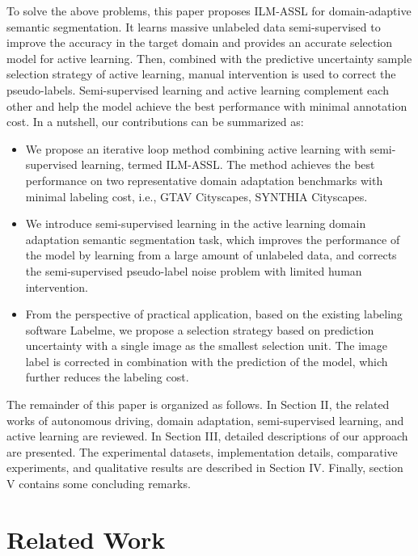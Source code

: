 \documentclass[journal]{IEEEtran}
\newcommand{\method}{ILM-ASSL\xspace}
\newcommand{\Ssl}{Semi-supervised learning\xspace}
\begin{document}
To solve the above problems, this paper proposes \method for domain-adaptive semantic segmentation. It learns massive unlabeled data semi-supervised to improve the accuracy in the target domain and provides an accurate selection model for active learning. Then, combined with the predictive uncertainty sample selection strategy of active learning, manual intervention is used to correct the pseudo-labels. \Ssl and active learning complement each other and help the model achieve the best performance with minimal annotation cost. In a nutshell, our contributions can be summarized as: 
\begin{itemize}
  \item We propose an iterative loop method combining active learning with semi-supervised learning, termed \method. The method achieves the best performance on two representative domain adaptation benchmarks with minimal labeling cost, i.e., GTAV  Cityscapes, SYNTHIA  Cityscapes.
  \item We introduce semi-supervised learning in the active learning domain adaptation semantic segmentation task, which improves the performance of the model by learning from a large amount of unlabeled data, and corrects the semi-supervised pseudo-label noise problem with limited human intervention.
  \item From the perspective of practical application, based on the existing labeling software Labelme, we propose a selection strategy based on prediction uncertainty with a single image as the smallest selection unit. The image label is corrected in combination with the prediction of the model, which further reduces the labeling cost.
\end{itemize}

The remainder of this paper is organized as follows. In Section II, the related works of autonomous driving, domain adaptation, semi-supervised learning, and active learning are reviewed. In Section III, detailed descriptions of our approach are presented. The experimental datasets, implementation details, comparative experiments, and qualitative results are described in Section IV. Finally, section V contains some concluding remarks.

\section{Related Work}
\label{sec:related}
\end{document}
